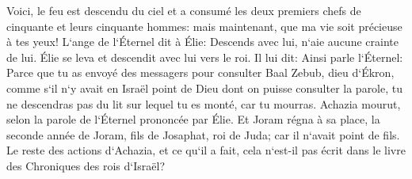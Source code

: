 \verse Voici, le feu est descendu du ciel et a consumé les deux premiers chefs de cinquante et leurs cinquante hommes: mais maintenant, que ma vie soit précieuse à tes yeux! 
\verse L`ange de l`Éternel dit à Élie: Descends avec lui, n`aie aucune crainte de lui. Élie se leva et descendit avec lui vers le roi. 
\verse Il lui dit: Ainsi parle l`Éternel: Parce que tu as envoyé des messagers pour consulter Baal Zebub, dieu d`Ékron, comme s`il n`y avait en Israël point de Dieu dont on puisse consulter la parole, tu ne descendras pas du lit sur lequel tu es monté, car tu mourras. 
\verse Achazia mourut, selon la parole de l`Éternel prononcée par Élie. Et Joram régna à sa place, la seconde année de Joram, fils de Josaphat, roi de Juda; car il n`avait point de fils. 
\verse Le reste des actions d`Achazia, et ce qu`il a fait, cela n`est-il pas écrit dans le livre des Chroniques des rois d`Israël? 

\chapter{}

